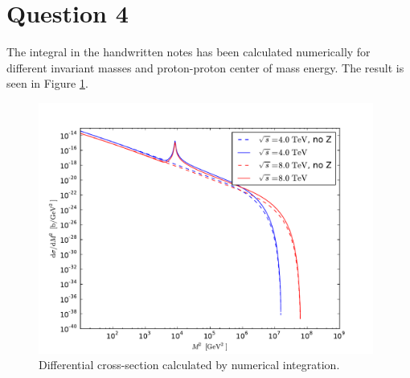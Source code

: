 \documentclass[a4paper,10pt]{article}
\begin{document}
\section{Question 4}
The integral in the handwritten notes has been calculated numerically for different invariant masses and proton-proton center of mass energy. The result is seen in Figure \ref{cc}.
\begin{figure}
\centering
\includegraphics[width=11cm]{../cc.pdf}
\caption{Differential cross-section calculated by numerical integration.}
\label{cc}
\end{figure}
\end{document}
